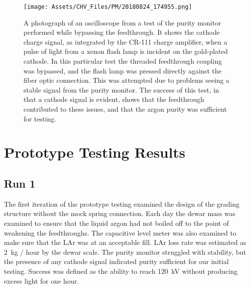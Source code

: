      
    \begin{figure}
    \centering

    \texttt{[image: Assets/CHV\_Files/PM/20180824\_174955.png]}
   
     \caption[A photograph of an oscilloscope from a test of the purity monitor performed while bypassing the feedthrough. ]%
     {A photograph of an oscilloscope from a test of the purity monitor performed while bypassing the feedthrough. 
     It shows the cathode charge signal, as integrated by the CR-111 charge amplifier, when a pulse of light from a xenon flash lamp is incident on the gold-plated cathode.
     In this particular test the threaded feedthrough coupling was bypassed, and the flash lamp was pressed directly against the fiber optic connection.
     This was attempted due to problems seeing a stable signal from the purity monitor.
     The success of this test, in that a cathode signal is evident, shows that the feedthrough contributed to these issues, and that the argon purity was sufficient for testing.}
     \label{fig:puritymonitorhailmary2}
     \end{figure}
\afterpage{\FloatBarrier}
\section{Prototype Testing Results}
\subsection{Run 1}
\label{sec:run1_chv}

The first iteration of the prototype testing examined the design of the grading structure without the mock spring connection.
Each day the dewar mass was examined to ensure that the liquid argon had not boiled off to the point of weakening the feedthroughs.
The capacitive level meter was also examined to make sure that the LAr was at an acceptable fill.
LAr loss rate was estimated as 2~kg / hour by the dewar scale.
The purity monitor struggled with stability, but the presence of any cathode signal indicated purity sufficient for our initial testing.
Success was defined as the ability to reach 120~kV without producing excess light for one hour.


